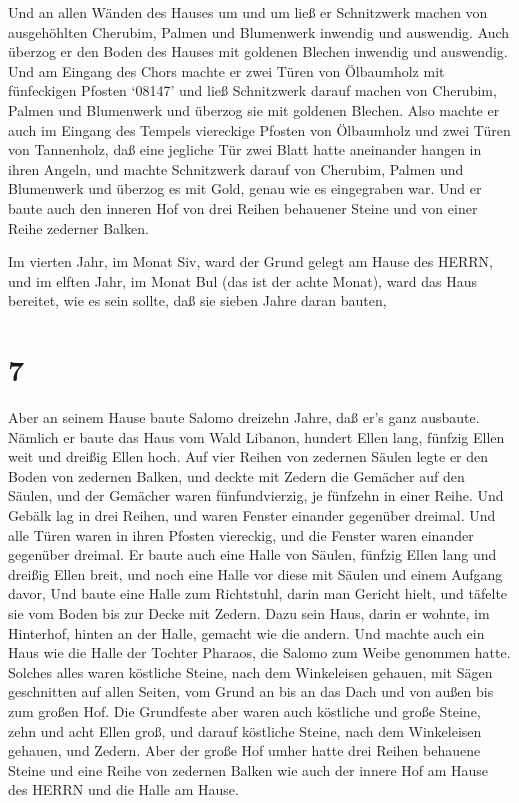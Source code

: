  Und an allen Wänden des Hauses um und um ließ er
Schnitzwerk machen von ausgehöhlten Cherubim, Palmen und Blumenwerk
inwendig und auswendig.  Auch überzog er den Boden des
Hauses mit goldenen Blechen inwendig und auswendig.  Und am
Eingang des Chors machte er zwei Türen von Ölbaumholz mit fünfeckigen
Pfosten  `08147' und ließ Schnitzwerk darauf machen von
Cherubim, Palmen und Blumenwerk und überzog sie mit goldenen Blechen.
 Also machte er auch im Eingang des Tempels viereckige
Pfosten von Ölbaumholz  und zwei Türen von Tannenholz, daß
eine jegliche Tür zwei Blatt hatte aneinander hangen in ihren Angeln,
 und machte Schnitzwerk darauf von Cherubim, Palmen und
Blumenwerk und überzog es mit Gold, genau wie es eingegraben war.
 Und er baute auch den inneren Hof von drei Reihen
behauener Steine und von einer Reihe zederner Balken.

 Im vierten Jahr, im Monat Siv, ward der Grund gelegt am
Hause des HERRN,  und im elften Jahr, im Monat Bul (das ist
der achte Monat), ward das Haus bereitet, wie es sein sollte, daß sie
sieben Jahre daran bauten,

\hypertarget{section-6}{%
\section{7}\label{section-6}}

 Aber an seinem Hause baute Salomo dreizehn Jahre, daß er's
ganz ausbaute.  Nämlich er baute das Haus vom Wald Libanon,
hundert Ellen lang, fünfzig Ellen weit und dreißig Ellen hoch. Auf vier
Reihen von zedernen Säulen legte er den Boden von zedernen Balken,
 und deckte mit Zedern die Gemächer auf den Säulen, und der
Gemächer waren fünfundvierzig, je fünfzehn in einer Reihe. 
Und Gebälk lag in drei Reihen, und waren Fenster einander gegenüber
dreimal.  Und alle Türen waren in ihren Pfosten viereckig,
und die Fenster waren einander gegenüber dreimal.  Er baute
auch eine Halle von Säulen, fünfzig Ellen lang und dreißig Ellen breit,
und noch eine Halle vor diese mit Säulen und einem Aufgang davor,
 Und baute eine Halle zum Richtstuhl, darin man Gericht
hielt, und täfelte sie vom Boden bis zur Decke mit Zedern. 
Dazu sein Haus, darin er wohnte, im Hinterhof, hinten an der Halle,
gemacht wie die andern. Und machte auch ein Haus wie die Halle der
Tochter Pharaos, die Salomo zum Weibe genommen hatte. 
Solches alles waren köstliche Steine, nach dem Winkeleisen gehauen, mit
Sägen geschnitten auf allen Seiten, vom Grund an bis an das Dach und von
außen bis zum großen Hof.  Die Grundfeste aber waren auch
köstliche und große Steine, zehn und acht Ellen groß,  und
darauf köstliche Steine, nach dem Winkeleisen gehauen, und Zedern.
 Aber der große Hof umher hatte drei Reihen behauene Steine
und eine Reihe von zedernen Balken wie auch der innere Hof am Hause des
HERRN und die Halle am Hause.

